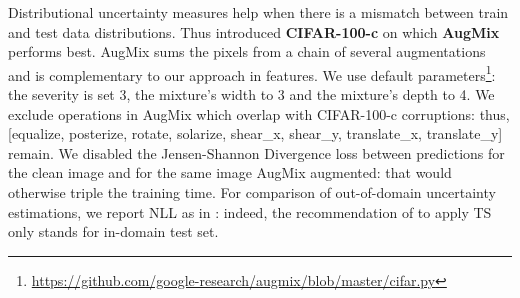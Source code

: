 \documentclass[10pt,twocolumn,letterpaper]{article}
\begin{document}
Distributional uncertainty measures help when there is a mismatch between train
and test data distributions. Thus \cite{hendrycks2018benchmarking} introduced
\textbf{CIFAR-100-c} on which \textbf{AugMix} performs best. AugMix sums the
pixels from a chain of several augmentations and is complementary to our
approach in features. We use default
parameters\footnote{\url{https://github.com/google-research/augmix/blob/master/cifar.py}}:
the severity is set 3, the mixture's width to 3 and the mixture's depth to 4. We
exclude operations in AugMix which overlap with CIFAR-100-c corruptions: thus,
[equalize, posterize, rotate, solarize, shear\_x, shear\_y, translate\_x,
translate\_y] remain. We disabled the Jensen-Shannon Divergence loss between
predictions for the clean image and for the same image AugMix
augmented: that would otherwise triple the training time. For comparison of out-of-domain uncertainty estimations, we report NLL as in \cite{havasi2020raining,ovadia2019can}: indeed, the recommendation of \cite{ashukha2020pitfalls} to apply TS only stands for in-domain test set.
\end{document}
